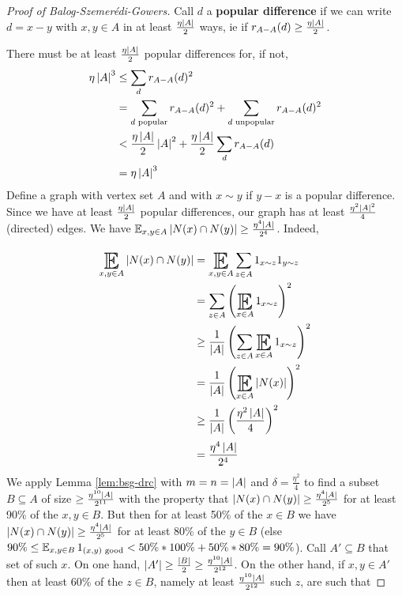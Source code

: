 \documentclass{article}
\begin{document}
\begin{proof}[Proof of Balog-Szemerédi-Gowers]
  Call $d$ a {\bf popular difference} if we can write $d = x - y$ with $x, y \in A$ in at least $\frac{\eta\left\lvert A\right\rvert}2$ ways, ie if $r_{A - A}(d) \ge \frac{\eta\left\lvert A\right\rvert}2$.

  There must be at least $\frac{\eta\left\lvert A\right\rvert}2$ popular differences for, if not,
  \begin{align*}
    \eta\left\lvert A\right\rvert^3
    & \le \sum_d r_{A - A}(d)^2 \\
    & = \sum_{d\text{ popular}} r_{A - A}(d)^2 + \sum_{d\text{ unpopular}} r_{A - A}(d)^2 \\
    & < \frac{\eta\left\lvert A\right\rvert}2 \left\lvert A\right\rvert^2 + \frac{\eta\left\lvert A\right\rvert}2\sum_d r_{A - A}(d) \\
    & = \eta\left\lvert A\right\rvert^3 
  \end{align*}
  Define a graph with vertex set $A$ and with $x \sim y$ if $y - x$ is a popular difference. Since we have at least $\frac{\eta\left\lvert A\right\rvert}2$ popular differences, our graph has at least $\frac{\eta^2\left\lvert A\right\rvert^2}4$ (directed) edges. We have $\E_{x, y \in A} \abs{N(x) \inter N(y)} \ge \frac{\eta^4\abs A}{2^4}$. Indeed,
  \begin{align*}
    \E_{x, y \in A} \abs{N(x) \inter N(y)}
    & = \E_{x, y \in A} \sum_{z \in A} 1_{x \sim z} 1_{y \sim z} \\
    & = \sum_{z \in A} \left(\E_{x \in A} 1_{x \sim z}\right)^2 \\
    & \ge \frac 1{\abs A} \left(\sum_{z \in A} \E_{x \in A} 1_{x \sim z}\right)^2 \\
    & = \frac 1{\abs A} \left(\E_{x \in A} \abs{N(x)}\right)^2 \\
    & \ge \frac 1{\abs A} \left(\frac{\eta^2\abs A}4\right)^2 \\
    & = \frac{\eta^4\abs A}{2^4}
  \end{align*}
  We apply Lemma \ref{lem:bsg-drc} with $m = n = \left\lvert A\right\rvert$ and $\delta = \frac{\eta^2}4$ to find a subset $B \subseteq A$ of size $\ge \frac{\eta^{10}\left\lvert A\right\rvert}{2^{11}}$ with the property that $\left\lvert N(x) \cap N(y)\right\rvert \ge \frac{\eta^4\left\lvert A\right\rvert}{2^5}$ for at least 90\% of the $x, y \in B$. But then for at least 50\% of the $x \in B$ we have $\left\lvert N(x) \cap N(y)\right\rvert \ge \frac{\eta^4\left\lvert A\right\rvert}{2^5}$ for at least 80\% of the $y \in B$ (else $90\% \le \E_{x, y \in B} 1_{(x, y)\text{ good}} < 50\% * 100\% + 50\% * 80\% = 90\%$). Call $A' \subseteq B$ that set of such $x$. On one hand, $\left\lvert A'\right\rvert \ge \frac{\left\lvert B\right\rvert}2 \ge \frac{\eta^{10}\left\lvert A\right\rvert}{2^{12}}$. On the other hand, if $x, y \in A'$ then at least 60\% of the $z \in B$, namely at least $\frac{\eta^{10}\left\lvert A\right\rvert}{2^{12}}$ such $z$, are such that

\end{proof}
\end{document}
